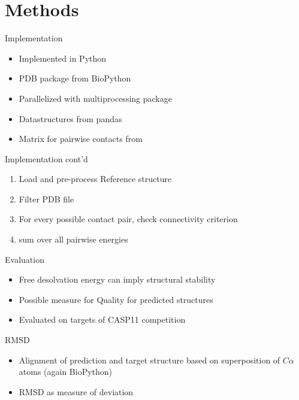 \section{Methods}


\begin{frame}{Implementation}
	\begin{itemize}[<+->]
	    \item Implemented in Python
    	\item PDB package from BioPython \cite{pdb}
    	\item Parallelized with multiprocessing package
    	\item Datastructures from pandas
    	\item Matrix for pairwise contacts from \cite{Zhang1997}
	\end{itemize}
\end{frame}

\begin{frame}{Implementation cont'd}
	\begin{enumerate}[<+->]
		\item Load and pre-process Reference structure
	    \item Filter PDB file
	    \item For every possible contact pair, check connectivity criterion
	    \item sum over all pairwise energies
	\end{enumerate}
\end{frame}

\begin{frame}{Evaluation}
    \begin{itemize}
        \item Free desolvation energy can imply structural stability
        \item Possible measure for Quality for predicted structures
        \item Evaluated on targets of CASP11 competition
    \end{itemize}
\end{frame}

\begin{frame}{RMSD}
	\begin{itemize}
		\item Alignment of prediction and target structure based on superposition of $C\alpha$ atoms (again BioPython)
		\item RMSD as measure of deviation
		
	\end{itemize}
\end{frame}




